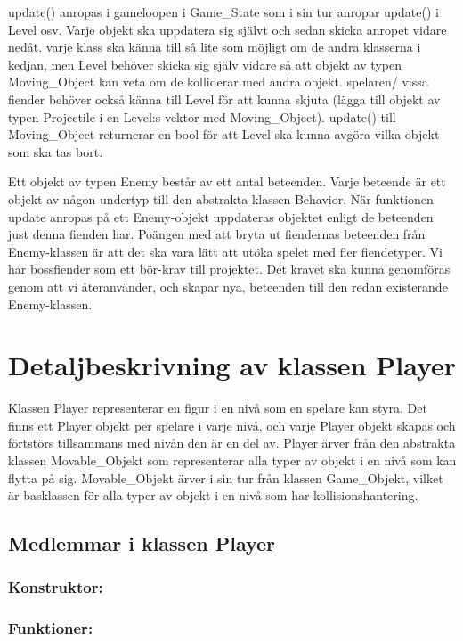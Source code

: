 \documentclass{TDP005mall}
\begin{document}
update() anropas i gameloopen i Game\_State som i sin tur anropar update() i Level osv. Varje objekt ska uppdatera sig självt och sedan skicka anropet vidare nedåt. varje klass ska känna till så lite som möjligt om de andra klasserna i kedjan, men Level behöver skicka sig själv vidare så att objekt av typen Moving\_Object kan veta om de kolliderar med andra objekt. spelaren/ vissa fiender behöver också känna till Level för att kunna skjuta (lägga till objekt av typen Projectile i en Level:s vektor med Moving\_Object). update() till Moving\_Object returnerar en bool för att Level ska kunna avgöra vilka objekt som ska tas bort.

Ett objekt av typen Enemy består av ett antal beteenden. Varje beteende är ett objekt av någon undertyp till den abstrakta klassen Behavior. När funktionen update anropas på ett Enemy-objekt uppdateras objektet enligt de beteenden just denna fienden har. Poängen med att bryta ut fiendernas beteenden från Enemy-klassen är att det ska vara lätt att utöka spelet med fler fiendetyper. Vi har bossfiender som ett bör-krav till projektet. Det kravet ska kunna genomföras genom att vi återanvänder, och skapar nya, beteenden till den redan existerande Enemy-klassen.  

\section{Detaljbeskrivning av klassen Player}
Klassen Player representerar en figur i en nivå som en spelare kan styra. Det finns ett Player objekt per spelare i varje nivå, och varje Player objekt skapas och förtstörs tillsammans med nivån den är en del av. Player ärver från den abstrakta klassen Movable\_Objekt som representerar alla typer av objekt i en nivå som kan flytta på sig. Movable\_Objekt ärver i sin tur från klassen Game\_Objekt, vilket är basklassen för alla typer av objekt i en nivå som har kollisionshantering.    

\subsection{Medlemmar i klassen Player}
\subsubsection{Konstruktor:}

\subsubsection{Funktioner:}
\end{document}
